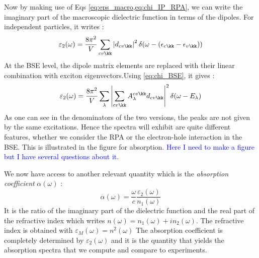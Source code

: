 Now by making use of Eqs \eqref{eq:eps_macro,eq:chi_IP_RPA}, we can write the imaginary part of the macroscopic dielectric function in terms of the dipoles. For independent particles, it writes :
\begin{equation}
	\varepsilon_2(\omega) = \frac{8\pi^2}{V} \sum_{cv\kk} \left| d_{cv\kk} \right|^2 \delta(\omega - (\epsilon_{c\kk} - \epsilon_{v\kk}) ) \label{eq:eps_2_IP}
\end{equation}
At the \gls{BSE} level, the dipole matrix elements are replaced with their linear combination with exciton eigenvectors.Using \eqref{eq:chi_BSE}, it gives :
\begin{equation}
	\varepsilon_2(\omega) = \frac{8\pi^2}{V} \sum_\lambda \left| \sum_{cv\kk} A_\lambda^{cv\kk} d_{cv\kk} \right|^2 \delta(\omega - E_\lambda) \label{eq:eps_2_exc}
\end{equation}
As one can see in the denominators of the two versions, the peaks are not given by the same excitations. Hence the spectra will exhibit are quite different features, whether we consider the RPA or the electron-hole interaction in the BSE. This is illustrated in the figure for absorption. \textcolor{blue}{Here I need to make a figure but I have several questions about it.}

We now have access to another relevant quantity which is the \textit{absorption coefficient} $\alpha(\omega)$ :
\begin{equation}
	\alpha(\omega) = \frac{\omega}{c} \frac{\varepsilon_2(\omega)}{n_1(\omega)} \label{eq:abs_coeff}
\end{equation}
It is the ratio of the imaginary part of the dielectric function and the real part of the refractive index which writes $n(\omega) = n_1(\omega) + i n_2(\omega)$. The refractive index is obtained with $\varepsilon_M(\omega) = n^2(\omega)$
The absorption coefficient is completely determined by $\varepsilon_2(\omega)$ and it is the quantity that yields the absorption spectra that we compute and compare to experiments.

